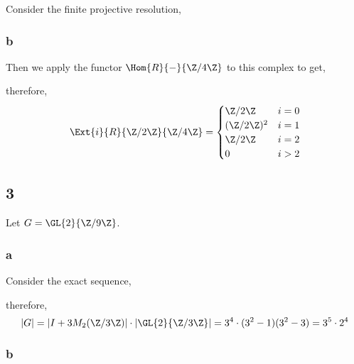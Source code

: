 \documentclass[12pt]{article}
\begin{document}
Consider the finite projective resolution,
\begin{center}
\end{center}

\subsubsection{b}

Then we apply the functor $\Hom{R}{-}{\Z/4\Z}$ to this complex to get,
\begin{center}
\end{center}
therefore,
\[ \Ext{i}{R}{\Z / 2 \Z}{\Z / 4 \Z} = 
\begin{cases}
\Z / 2 \Z & i = 0
\\
(\Z / 2 \Z)^2 & i = 1
\\
\Z / 2 \Z & i = 2
\\
0 & i > 2
\end{cases} \]



\subsection{3}

Let $G = \GL{2}{\Z/9\Z}$.

\subsubsection{a}

Consider the exact sequence,
\begin{center}
\end{center}
therefore,
\[ |G| = |I + 3 M_2(\Z/3\Z)| \cdot |\GL{2}{\Z / 3 \Z}| = 3^4 \cdot (3^2 - 1)(3^2 - 3) = 3^5 \cdot 2^4 \]

\subsubsection{b}
\end{document}

